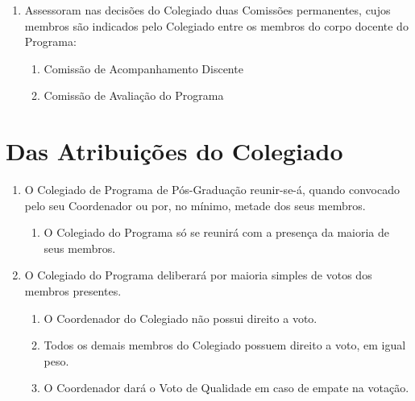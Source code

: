 \documentclass{article}
\newcommand{\singleitem}{\item[Parágrafo Único.]}
\begin{document}
\begin{enumerate}
	\item Assessoram nas decisões do Colegiado duas Comissões permanentes, cujos membros são indicados pelo Colegiado entre os membros do corpo docente do Programa:
	\begin{enumerate}[label=\Roman*]
		\item Comissão de Acompanhamento Discente
		\item Comissão de Avaliação do Programa
	\end{enumerate}

\end{enumerate}

\section{Das Atribuições do Colegiado}
\begin{enumerate}

	\item O Colegiado de Programa de Pós-Graduação reunir-se-á, quando convocado pelo seu Coordenador ou por, no mínimo, metade dos seus membros.
	\begin{enumerate}
		\singleitem O Colegiado do Programa só se reunirá com a presença da maioria de seus membros. 
	\end{enumerate}

	\item O Colegiado do Programa deliberará por maioria simples de votos dos membros presentes.
	\begin{enumerate}
		\item O Coordenador do Colegiado não possui direito a voto. 
		\item Todos os demais membros do Colegiado possuem direito a voto, em igual peso.
		\item O Coordenador dará o Voto de Qualidade em caso de empate na votação. %
	\end{enumerate}



\end{enumerate}
\end{document}
